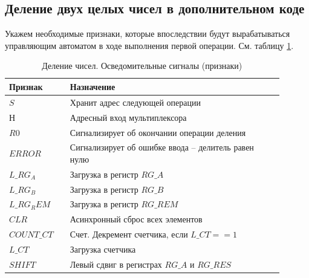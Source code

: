 \documentclass[a4paper,14pt]{extarticle}
\begin{document}
\subsection{Деление двух целых чисел в дополнительном коде}
Укажем необходимые признаки, которые впоследствии будут вырабатываться управляющим автоматом в ходе выполнения первой операции. См. таблицу \ref{tab:signalsop1}.
\begin{table}[h!]
	\small
	\centering
	\begin{tabular}{|m{0.2\linewidth}|m{0.7\linewidth}|}
		\hline
		\textbf{Признак} & \textbf{Назначение} \\ \hline
		$S$ & Хранит адрес следующей операции \\ \hline
		$Н$ & Адресный вход мультиплексора \\ \hline
		$R0$ & Сигнализирует об окончании операции деления \\ \hline
		$ERROR$ & Сигнализирует об ошибке ввода -- делитель равен нулю \\ \hline
		$L\_RG_A$ & Загрузка в регистр $RG\_A$ \\ \hline
		$L\_RG_B$ & Загрузка в регистр $RG\_B$ \\ \hline
		$L\_RG_REM$ & Загрузка в регистр $RG\_REM$ \\ \hline
		$CLR$ & Асинхронный сброс всех элементов \\ \hline
		$COUNT\_CT$ & Счет. Декремент счетчика, если $L\_CT==1$ \\ \hline
		$L\_CT$ & Загрузка счетчика \\ \hline
		$SHIFT$ & Левый сдвиг в регистрах $RG\_A \text{ и } RG\_RES$ \\ \hline
	\end{tabular}
	\caption{Деление чисел. Осведомительные сигналы (признаки)}
	\label{tab:signalsop1}
\end{table}
\end{document}
